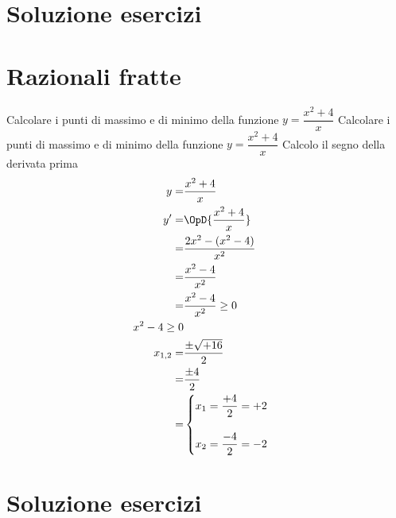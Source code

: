 \section{Soluzione esercizi}
\tcbinputrecords
\newpage
\section{Razionali fratte}
\tcbstartrecording
\begin{exercise}
Calcolare i punti di massimo e di minimo della funzione $y=\dfrac{x^2+4}{x}$
	\tcblower
Calcolare i punti di massimo e di minimo della funzione $y=\dfrac{x^2+4}{x}$
Calcolo il segno della derivata prima
\begin{align*}
y=&\dfrac{x^2+4}{x}\\
y'=&\OpD{\dfrac{x^2+4}{x}}\\
=&\frac{2x^2-(x^2-4)}{x^{2}}\\
=&\frac{x^{2} - 4}{x^{2}}\\
=&\frac{x^{2} - 4}{x^{2}}\geq 0\\
x^2-4\geq 0\\
x_{1,2}=&\dfrac{\pm\sqrt{+16}}{2}\\
=&\dfrac{\pm 4}{2}\\
=&\begin{cases}
x_1=\dfrac{+4}{2}=+2\\
\\
x_2=\dfrac{-4}{2}=-2\\
\end{cases}
\end{align*}
\end{exercise}
\tcbstoprecording
\newpage
\section{Soluzione esercizi}
\tcbinputrecords
\newpage